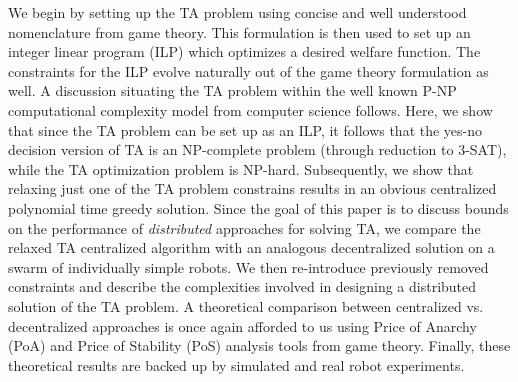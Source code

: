 \documentclass[11pt, onecolumn, compsoc, letterpaper]{article}
\begin{document}
We begin by setting up the TA problem using concise and well understood nomenclature from game theory. This formulation is then used to set up an integer linear program (ILP) which optimizes a desired welfare function. The constraints for the ILP evolve naturally out of the game theory formulation as well. A discussion situating the TA problem within the well known P-NP computational complexity model from computer science follows. Here, we show that since the TA problem can be set up as an ILP, it follows that the yes-no decision version of TA is an NP-complete problem (through reduction to 3-SAT), while the TA optimization problem is NP-hard. Subsequently, we show that relaxing just one of the TA problem constrains results in an obvious centralized polynomial time greedy solution. Since the goal of this paper is to discuss bounds on the performance of \emph{distributed} approaches for solving TA, we compare the relaxed TA centralized algorithm with an analogous decentralized solution on a swarm of individually simple robots. We then re-introduce previously removed constraints and describe the complexities involved in designing a distributed solution of the TA problem. A theoretical comparison between centralized vs. decentralized approaches is once again afforded to us using Price of Anarchy (PoA) and Price of Stability (PoS) analysis tools from game theory. Finally, these theoretical results are backed up by simulated and real robot experiments.


\end{document}
